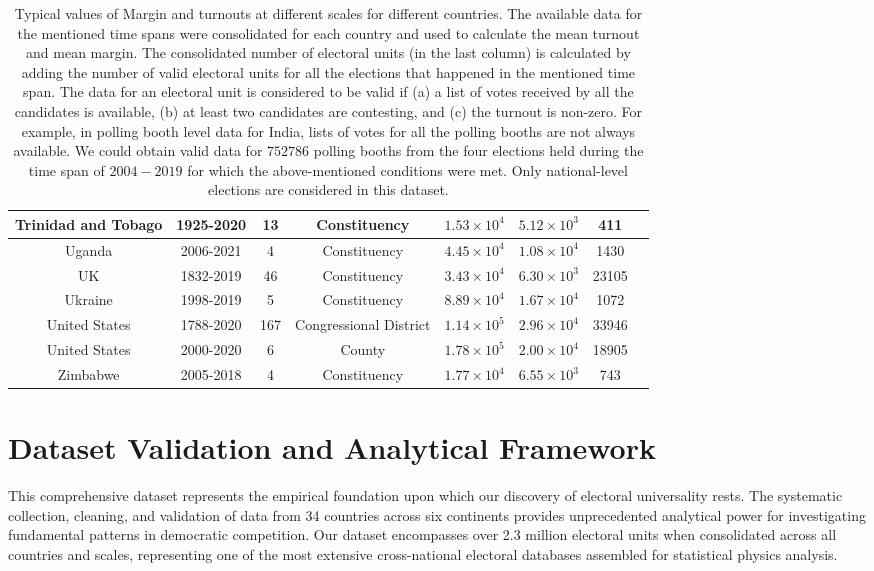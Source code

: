 \begin{table}[H]
{\begin{tabular}{|c|c|c|c|c|c|c|c|}
Trinidad and Tobago & 1925-2020 & 13 & Constituency & $1.53\times 10^{4}$ & $5.12\times 10^{3}$ & 411\\ \hline
Uganda & 2006-2021 & 4 & Constituency & $4.45\times 10^{4}$ & $1.08\times 10^{4}$ & 1430\\ \hline
UK & 1832-2019 & 46 & Constituency & $3.43\times 10^{4}$ & $6.30\times 10^{3}$ & 23105\\ \hline
Ukraine & 1998-2019 & 5 & Constituency & $8.89\times 10^{4}$ & $1.67\times 10^{4}$ & 1072\\ \hline
United States & 1788-2020 & 167 & Congressional District & $1.14\times 10^{5}$ & $2.96\times 10^{4}$ & 33946\\ \hline
United States & 2000-2020 & 6 & County & $1.78\times 10^{5}$ & $2.00\times 10^{4}$ & 18905\\ \hline
Zimbabwe & 2005-2018 & 4 & Constituency & $1.77\times 10^{4}$ & $6.55\times 10^{3}$ & 743\\ \hline
\end{tabular}
}
\caption{Typical values of Margin and turnouts at different scales for different countries. The available data for the mentioned time spans were consolidated for each country and used to calculate the mean turnout and mean margin. The consolidated number of electoral units (in the last column) is calculated by adding the number of valid electoral units for all the elections that happened in the mentioned time span. The data for an electoral unit is considered to be valid if (a) a list of votes received by all the candidates is available, (b) at least two candidates are contesting, and (c) the turnout is non-zero. For example, in polling booth level data for India, lists of votes for all the polling booths are not always available. We could obtain valid data for $752786$ polling booths from the four elections held during the time span of $2004-2019$ for which the above-mentioned conditions were met. Only national-level elections are considered in this dataset.}
\label{tab:election_stats}
\end{table}

\newpage
\section{Dataset Validation and Analytical Framework}

This comprehensive dataset represents the empirical foundation upon which our discovery of electoral universality rests. The systematic collection, cleaning, and validation of data from 34 countries across six continents provides unprecedented analytical power for investigating fundamental patterns in democratic competition. Our dataset encompasses over 2.3 million electoral units when consolidated across all countries and scales, representing one of the most extensive cross-national electoral databases assembled for statistical physics analysis.

